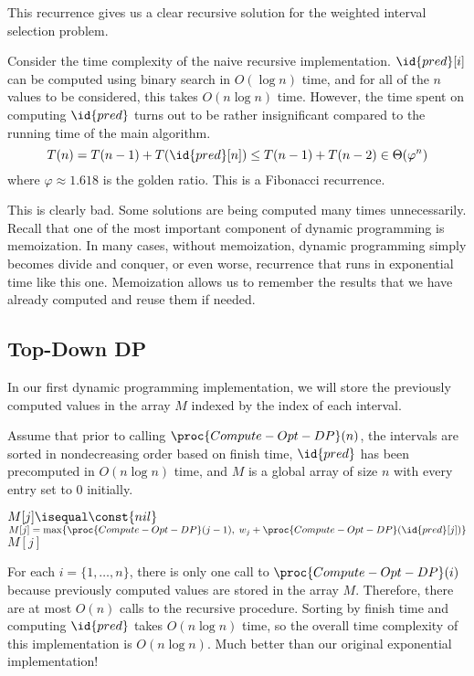 This recurrence gives us a clear recursive solution for the weighted interval selection problem.

Consider the time complexity of the naive recursive implementation. $\id{pred}[i]$ can be computed using binary search in $O(\log n)$ time, and for all of the $n$ values to be considered, this takes $O(n \log n)$ time. However, the time spent on computing $\id{pred}$ turns out to be rather insignificant compared to the running time of the main algorithm.
$$
T(n) = T(n-1) + T(\id{pred}[n]) \leq T(n-1) + T(n-2) \in \Theta(\varphi^n)
$$
where $\varphi \approx 1.618$ is the golden ratio. This is a Fibonacci recurrence.

This is clearly bad. Some solutions are being computed many times unnecessarily. Recall that one of the most important component of dynamic programming is memoization. In many cases, without memoization, dynamic programming simply becomes divide and conquer, or even worse, recurrence that runs in exponential time like this one. Memoization allows us to remember the results that we have already computed and reuse them if needed.

\subsection{Top-Down DP}
In our first dynamic programming implementation, we will store the previously computed values in the array $M$ indexed by the index of each interval.

Assume that prior to calling $\proc{Compute-Opt-DP}(n)$, the intervals are sorted in nondecreasing order based on finish time, $\id{pred}$ has been precomputed in $O(n\log n)$ time, and $M$ is a global array of size $n$ with every entry set to 0 initially.

\begin{codebox}
    \li \If $M[j] \isequal \const{nil}$ \Then 
        \li $M[j] = \max\{\proc{Compute-Opt-DP}(j-1),\; w_j + \proc{Compute-Opt-DP}(\id{pred}[j]) \}$
    \End
    \li \Return $M[j]$
\end{codebox}

For each $i = \{1,\ldots,n\}$, there is only one call to $\proc{Compute-Opt-DP}(i)$ because previously computed values are stored in the array $M$. Therefore, there are at most $O(n)$ calls to the recursive procedure. Sorting by finish time and computing $\id{pred}$ takes $O(n \log n)$ time, so the overall time complexity of this implementation is $O(n \log n)$. Much better than our original exponential implementation!

